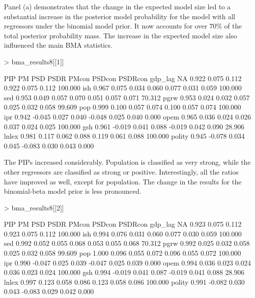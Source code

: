 \documentclass[a4paper]{article}
\begin{document}
Panel (a) demonstrates that the change in the expected model size led to a substantial increase in the posterior model probability for the model with all regressors under the binomial model prior. It now accounts for over $70\%$ of the total posterior probability mass. The increase in the expected model size also influenced the main BMA statistics.
\begin{Schunk}
\begin{Sinput}
> bma_results8[[1]]
\end{Sinput}
\begin{Soutput}
          PIP     PM   PSD  PSDR  PMcon PSDcon PSDRcon    %
gdp_lag    NA  0.922 0.075 0.112  0.922  0.075   0.112 100.000
ish     0.967  0.075 0.034 0.060  0.077  0.031   0.059 100.000
sed     0.953  0.049 0.057 0.070  0.051  0.057   0.071  70.312
pgrw    0.953  0.024 0.032 0.057  0.025  0.032   0.058  99.609
pop     0.999  0.100 0.057 0.074  0.100  0.057   0.074 100.000
ipr     0.942 -0.045 0.027 0.040 -0.048  0.025   0.040   0.000
opem    0.965  0.036 0.024 0.026  0.037  0.024   0.025 100.000
gsh     0.961 -0.019 0.041 0.088 -0.019  0.042   0.090  28.906
lnlex   0.981  0.117 0.062 0.088  0.119  0.061   0.088 100.000
polity  0.945 -0.078 0.034 0.045 -0.083  0.030   0.043   0.000
\end{Soutput}
\end{Schunk}
The PIPs increased considerably. Population is classified as very strong, while the other regressors are classified as strong or positive. Interestingly, all the ratios have improved as well, except for population. The change in the results for the binomial-beta model prior is less pronounced.
\begin{Schunk}
\begin{Sinput}
> bma_results8[[2]]
\end{Sinput}
\begin{Soutput}
          PIP     PM   PSD  PSDR  PMcon PSDcon PSDRcon    %
gdp_lag    NA  0.923 0.075 0.112  0.923  0.075   0.112 100.000
ish     0.994  0.076 0.031 0.060  0.077  0.030   0.059 100.000
sed     0.992  0.052 0.055 0.068  0.053  0.055   0.068  70.312
pgrw    0.992  0.025 0.032 0.058  0.025  0.032   0.058  99.609
pop     1.000  0.096 0.055 0.072  0.096  0.055   0.072 100.000
ipr     0.990 -0.047 0.025 0.039 -0.047  0.025   0.039   0.000
opem    0.994  0.036 0.023 0.024  0.036  0.023   0.024 100.000
gsh     0.994 -0.019 0.041 0.087 -0.019  0.041   0.088  28.906
lnlex   0.997  0.123 0.058 0.086  0.123  0.058   0.086 100.000
polity  0.991 -0.082 0.030 0.043 -0.083  0.029   0.042   0.000
\end{Soutput}
\end{Schunk}
\end{document}
